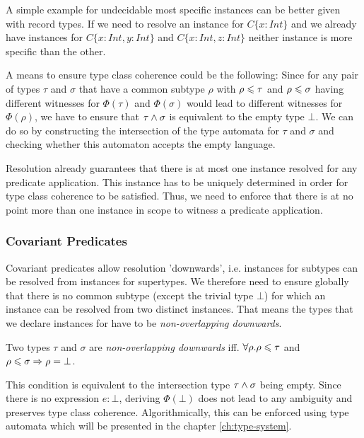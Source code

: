 A simple example for undecidable most specific instances can be better given with record types.
If we need to resolve an instance for $C \{x : Int\}$ and we already have instances for $C \{x : Int, y : Int\}$ and $C \{x : Int, z : Int\}$ neither instance is more specific than the other.


A means to ensure type class coherence could be the following:
Since for any pair of types $\tau$ and $\sigma$ that have a common subtype $\rho$ with $\rho \leqslant \tau$ and $\rho \leqslant \sigma$ having different witnesses for $\Phi(\tau)$ and $\Phi(\sigma)$ would lead to different witnesses for $\Phi(\rho)$,
we have to ensure that $\tau \wedge \sigma$ is equivalent to the empty type $\bot$.
We can do so by constructing the intersection of the type automata for $\tau$ and $\sigma$ and checking whether this automaton accepts the empty language.


Resolution already guarantees that there is at most one instance resolved for any predicate application.
This instance has to be uniquely determined in order for type class coherence to be satisfied.
Thus, we need to enforce that there is at no point more than one instance in scope to witness a predicate application.

\subsubsection{Covariant Predicates}

Covariant predicates allow resolution 'downwards', i.e. instances for subtypes can be resolved from instances for supertypes.
We therefore need to ensure globally that there is no common subtype (except the trivial type $\bot$) for which an instance can be resolved from two distinct instances.
That means the types that we declare instances for have to be \emph{non-overlapping downwards}.

\begin{definition}
  Two types $\tau$ and $\sigma$ are \emph{non-overlapping downwards} iff. $\forall\rho. \rho \leqslant \tau$ and $\rho \leqslant \sigma \Rightarrow \rho = \bot$.
\end{definition}

This condition is equivalent to the intersection type $\tau \wedge \sigma$ being empty.
Since there is no expression $e : \bot$, deriving $\Phi(\bot)$ does not lead to any ambiguity and preserves type class coherence.
Algorithmically, this can be enforced using type automata which will be presented in the chapter \ref{ch:type-system}.

